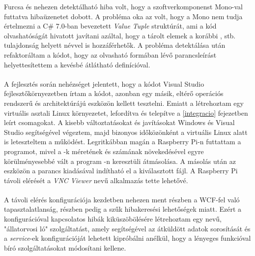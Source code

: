 Furcsa és nehezen detektálható hiba volt, hogy a szoftverkomponenst Mono-val futtatva  hibaüzenetet dobott. A probléma oka az volt, hogy a Mono nem tudja értelmezni a C\# 7.0-ban bevezetett \textit{Value Tuple} struktúrát, ami a kód olvashatóságát hivatott javítani azáltal, hogy a tárolt elemek a korábbi ,  stb. tulajdonság helyett névvel is hozzáférhetők. A probléma detektálása után refaktoráltam a kódot, hogy az olvasható  formában lévő parancsleírást helyettesítettem a kevésbé átlátható  definícióval. \\
\\
A fejlesztés során nehézséget jelentett, hogy a kódot Visual Studio fejlesztőkörnyezetben írtam a kódot, azonban egy másik, eltérő operációs rendszerű és architektúrájú eszközön kellett tesztelni. Emiatt a létrehoztam egy virtuális asztali Linux környezetet, lefordítva és telepítve a \ref{integracio} fejezetben leírt csomagokat. A kisebb változtatásokat és javításokat Windows és Visual Studio segítségével végeztem, majd bizonyos időközönként a virtuális Linux alatt is leteszteltem a működést. Legritkábban magán a Raspberry Pi-n futtattam a programot, mivel a -k méretének és számának növekedésével egyre körülményesebbé vált a program -n keresztüli átmásolása. A másolás után az eszközön a  parancs kiadásával indítható el a kiválasztott  fájl. A Raspberry Pi távoli elérését a \textit{VNC Viewer} nevű alkalmazás tette lehetővé.\\
\\
A távoli elérés konfigurációja kezdetben nehezen ment részben a WCF-fel való tapasztalatlanság, részben pedig a szűk hibakeresési lehetőségek miatt. Ezért a konfigurációval kapcsolatos hibák kiküszöbölésére létrehoztam egy  nevű, "állatorvosi ló" szolgáltatást, amely segítségével az átküldött adatok sorosítását és a \textit{service}-ek konfigurációját lehetett kipróbálni anélkül, hogy a lényeges funkcióval bíró szolgáltatásokat módosítani kellene.